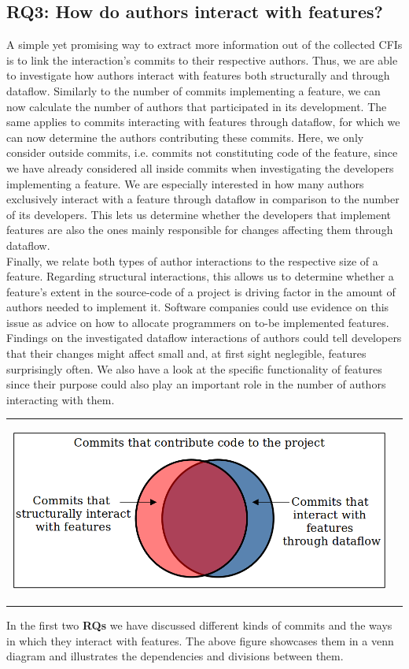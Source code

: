 \subsection*{\textbf{RQ3: How do authors interact with features?}}

A simple yet promising way to extract more information out of the collected CFIs is to link the interaction's commits to their respective authors.
Thus, we are able to investigate how authors interact with features both structurally and through dataflow.
Similarly to the number of commits implementing a feature, we can now calculate the number of authors that participated in its development.
The same applies to commits interacting with features through dataflow, for which we can now determine the authors contributing these commits.
Here, we only consider outside commits, i.e. commits not constituting code of the feature, since we have already considered all inside commits when investigating the developers implementing a feature.
We are especially interested in how many authors exclusively interact with a feature through dataflow in comparison to the number of its developers.
This lets us determine whether the developers that implement features are also the ones mainly responsible for changes affecting them through dataflow. \\
Finally, we relate both types of author interactions to the respective size of a feature.
Regarding structural interactions, this allows us to determine whether a feature's extent in the source-code of a project is driving factor in the amount of authors needed to implement it. 
Software companies could use evidence on this issue as advice on how to allocate programmers on to-be implemented features.
Findings on the investigated dataflow interactions of authors could tell developers that their changes might affect small and, at first sight neglegible, features surprisingly often.
We also have a look at the specific functionality of features since their purpose could also play an important role in the number of authors interacting with them.

\begin{center}
\begin{tabular}{cc}
\includegraphics[height=6cm]{gfx/Commits-of-a-Software-Project.png}
\end{tabular}
\end{center}
\textsf{
In the first two \textbf{RQs} we have discussed different kinds of commits and the ways in which they interact with features. 
The above figure showcases them in a venn diagram and illustrates the dependencies and divisions between them.
}

